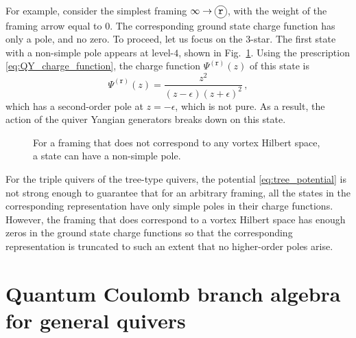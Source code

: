 \documentclass[12pt,a4paper]{article}
\renewcommand{\(}{\left(}
\renewcommand{\)}{\right)}
\newcommand{\eps}{\epsilon}
\newcommand*\circled[1]{\tikz[baseline=(char.base)]{
		\node[shape=circle,draw,inner sep=2pt] (char) {#1};}}
\renewcommand{\(}{\left(}
\renewcommand{\)}{\right)}
\begin{document}
For example, consider the simplest framing $\infty\to \circled{\texttt{r}}$, with the weight of the framing arrow equal to $0$. 
The corresponding ground state charge function has only a pole, and no zero.
To proceed, let us focus on the $3$-star.
The first state with a non-simple pole appears at level-$4$, shown in Fig.~\ref{fig:k=3_state}.
Using the prescription  \eqref{eq:QY_charge_function}, the charge function $\Psi^{(\mathtt{r})}(z)$ of this state is 
\begin{equation}
\Psi^{(\mathtt{r})}(z)=\frac{z^2}{(z-\epsilon)(z+\epsilon)^2}\,,
\end{equation}
which has a second-order pole at $z=-\eps$, which is not pure. 
As a result, the action of the quiver Yangian generators breaks down on this state. 
\begin{figure}[h]	
\centering
{}
\caption{For a framing that does not correspond to any vortex Hilbert space, a state can have a non-simple pole.}
\label{fig:k=3_state}
\end{figure}

For the triple quivers of the tree-type quivers, the potential \eqref{eq:tree_potential} is not strong enough to guarantee that for an arbitrary framing, all the states in the corresponding representation have only simple poles in their charge functions. 
However, the framing that does correspond to a vortex Hilbert space has enough zeros in the ground state charge functions so that the corresponding representation is truncated to such an extent that no higher-order poles arise. 


\section{Quantum Coulomb branch algebra for general quivers}\label{sec:Conjecture}
\end{document}
